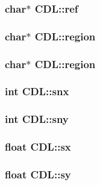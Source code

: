 \subsubsection{\setlength{\rightskip}{0pt plus 5cm}char$\ast$ \bf{CDL::ref}}\label{structCDL_ce3c2b6a6e709f917e93c958666cb0d0}


\subsubsection{\setlength{\rightskip}{0pt plus 5cm}char$\ast$ \bf{CDL::region}}\label{structCDL_1656d2bdfd7f3d4194761123e4f200a1}


\subsubsection{\setlength{\rightskip}{0pt plus 5cm}char$\ast$ \bf{CDL::region}}\label{structCDL_1656d2bdfd7f3d4194761123e4f200a1}


\subsubsection{\setlength{\rightskip}{0pt plus 5cm}int \bf{CDL::snx}}\label{structCDL_02987b0db0d97cdc90bd237bac5bf7aa}


\subsubsection{\setlength{\rightskip}{0pt plus 5cm}int \bf{CDL::sny}}\label{structCDL_db16de3752228e98b0a48f0a96fcc500}


\subsubsection{\setlength{\rightskip}{0pt plus 5cm}float \bf{CDL::sx}}\label{structCDL_027ab844ac0be1129d75afe0bfc04abb}


\subsubsection{\setlength{\rightskip}{0pt plus 5cm}float \bf{CDL::sy}}\label{structCDL_6d6cf1f24b64c2edf5383dece0acb939}


